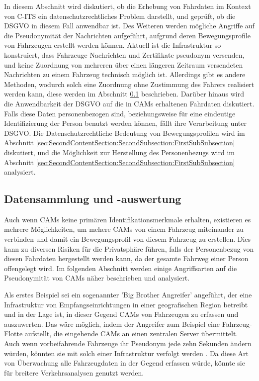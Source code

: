 In diesem Abschnitt wird diskutiert, ob die Erhebung von Fahrdaten im Kontext von C-ITS ein datenschutzrechtliches Problem darstellt, und geprüft, ob die DSGVO in diesem Fall anwendbar ist. Des Weiteren werden mögliche Angriffe auf die Pseudonymität der Nachrichten aufgeführt, aufgrund deren Bewegungsprofile von Fahrzeugen erstellt werden können. Aktuell ist die Infrastruktur so konstruiert, dass Fahrzeuge Nachrichten und Zertifikate pseudonym versenden, und keine Zuordnung von mehreren über einen längeren Zeitraum versendeten Nachrichten zu einem Fahrzeug technisch möglich ist. Allerdings gibt es andere Methoden, wodurch solch eine Zuordnung ohne Zustimmung des Fahrers realisiert werden kann, diese werden im Abschnitt \ref{sec:FirstContentSection:ThirdSubSection} beschrieben. Darüber hinaus wird die Anwendbarkeit der DSGVO auf die in CAMs erhaltenen Fahrdaten diskutiert. Falls diese Daten personenbezogen sind, beziehungsweise für eine eindeutige Identifizierung der Person benutzt werden können, fällt ihre Verarbeitung unter DSGVO. Die Datenschutzrechtliche Bedeutung von Bewegungsprofilen wird im Abschnitt \ref{sec:SecondContentSection:SecondSubsection:FirstSubSubsection} diskutiert, und die Möglichkeit zur Herstellung des Personenbezugs wird im Abschnitt \ref{sec:SecondContentSection:SecondSubsection:FirstSubSubsection} analysiert.

\subsection{Datensammlung und -auswertung}
\label{sec:FirstContentSection:ThirdSubSection}

Auch wenn CAMs keine primären Identifikationsmerkmale erhalten, existieren es mehrere Möglichkeiten, um mehere CAMs von einem Fahrzeug miteinander zu verbinden und damit ein Bewegungsprofil von diesem Fahrzeug zu erstellen. Dies kann zu diversen Risiken für die Privatsphäre führen, falls der Personenbezug von diesen Fahrdaten hergestellt werden kann, da der gesamte Fahrweg einer Person offengelegt wird. Im folgenden Abschnitt werden einige Angriffsarten auf die Pseudonymität von CAMs näher beschrieben und analysiert. 

Als erstes Beispiel sei ein sogenannter 'Big Brother Angreifer' angeführt, der eine Infrastruktur von Empfangseinrichtungen in einer geografischen Region betreibt und in der Lage ist, in dieser Gegend CAMs von Fahrzeugen zu erfassen und auszuwerten. Das wäre möglich, indem der Angreifer zum Beispiel eine Fahrzeug-Flotte aufstellt, die eingehende CAMs an einen zentralen Server übermittelt. Auch wenn vorbeifahrende Fahrzeuge ihr Pseudonym jede zehn Sekunden ändern würden, könnten sie mit solch einer Infrastruktur verfolgt werden \cite{Wiedersheim2010}. Da diese Art von Überwachung alle Fahrzeugdaten in der Gegend erfassen würde, könnte sie für breitere Verkehrsanalysen genutzt werden.

